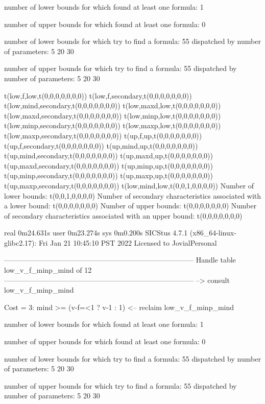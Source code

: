 number of lower bounds for which found at least one formula: 1

number of upper bounds for which found at least one formula: 0

number of lower bounds for which try to find a formula: 55
dispatched by number of parameters: 5  20  30

number of upper bounds for which try to find a formula: 55
dispatched by number of parameters: 5  20  30

t(low,f,low,t(0,0,0,0,0,0,0))
t(low,f,secondary,t(0,0,0,0,0,0,0))
t(low,mind,secondary,t(0,0,0,0,0,0,0))
t(low,maxd,low,t(0,0,0,0,0,0,0))
t(low,maxd,secondary,t(0,0,0,0,0,0,0))
t(low,minp,low,t(0,0,0,0,0,0,0))
t(low,minp,secondary,t(0,0,0,0,0,0,0))
t(low,maxp,low,t(0,0,0,0,0,0,0))
t(low,maxp,secondary,t(0,0,0,0,0,0,0))
t(up,f,up,t(0,0,0,0,0,0,0))
t(up,f,secondary,t(0,0,0,0,0,0,0))
t(up,mind,up,t(0,0,0,0,0,0,0))
t(up,mind,secondary,t(0,0,0,0,0,0,0))
t(up,maxd,up,t(0,0,0,0,0,0,0))
t(up,maxd,secondary,t(0,0,0,0,0,0,0))
t(up,minp,up,t(0,0,0,0,0,0,0))
t(up,minp,secondary,t(0,0,0,0,0,0,0))
t(up,maxp,up,t(0,0,0,0,0,0,0))
t(up,maxp,secondary,t(0,0,0,0,0,0,0))
t(low,mind,low,t(0,0,1,0,0,0,0))
Number of lower bounds:                                             t(0,0,1,0,0,0,0)
Number of secondary characteristics associated with a lower bound:  t(0,0,0,0,0,0,0)
Number of upper bounds:                                             t(0,0,0,0,0,0,0)
Number of secondary characteristics associated with an upper bound: t(0,0,0,0,0,0,0)

real	0m24.631s
user	0m23.274s
sys	0m0.200s
SICStus 4.7.1 (x86_64-linux-glibc2.17): Fri Jan 21 10:45:10 PST 2022
Licensed to JovialPersonal


--------------------------------------------------------------------------------
Handle table low_v_f_minp_mind of 12
--------------------------------------------------------------------------------
--> consult low_v_f_minp_mind

Cost =  3:  mind >= (v-f=<1 ? v-1 : 1)
<-- reclaim low_v_f_minp_mind

number of lower bounds for which found at least one formula: 1

number of upper bounds for which found at least one formula: 0

number of lower bounds for which try to find a formula: 55
dispatched by number of parameters: 5  20  30

number of upper bounds for which try to find a formula: 55
dispatched by number of parameters: 5  20  30

